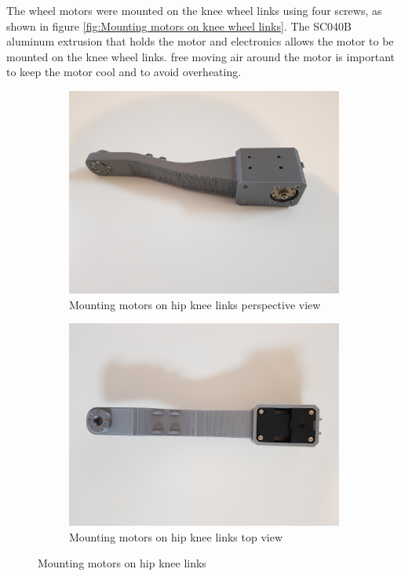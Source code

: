 The wheel motors were mounted on the knee wheel links using four screws, as shown in figure \ref{fig:Mounting motors on knee wheel links}. The SC040B aluminum extrusion that holds the motor and electronics allows the motor to be mounted on the knee wheel links. free moving air around the motor is important to keep the motor cool and to avoid overheating.
\begin{figure}[h]
	\centering
	\begin{subfigure}[t]{0.45\textwidth}
		\includegraphics[height=0.7\textwidth]{mounting_motors_on_hip_knee_links_1}
		\caption{Mounting motors on hip knee links perspective view}
		\label{fig:mountingmotorsonhipkneelinksperspectiveview}
	\end{subfigure}
	\begin{subfigure}[t]{0.45\textwidth}
		\includegraphics[height=0.7\textwidth]{mounting_motors_on_hip_knee_links_2}
		\caption{Mounting motors on hip knee links top view}
		\label{fig:mountingmotorsonhipkneelinkstopview}
	\end{subfigure}
	\caption{Mounting motors on hip knee links}
	\label{fig:Mounting motors on hip knee links}
\end{figure}

